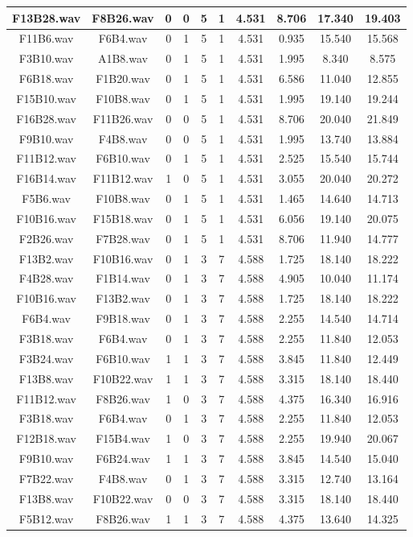 \documentclass[11pt,a4paper]{book}
\begin{document}
\begin{longtable}[c]{|c|c|c|c|c|c|c|c|c|c|}
F13B28.wav&F8B26.wav&0&0&5&1&4.531&8.706&17.340&19.403\\ \hline
F11B6.wav&F6B4.wav&0&1&5&1&4.531&0.935&15.540&15.568\\ \hline
F3B10.wav&A1B8.wav&0&1&5&1&4.531&1.995&8.340&8.575\\ \hline
F6B18.wav&F1B20.wav&0&1&5&1&4.531&6.586&11.040&12.855\\ \hline
F15B10.wav&F10B8.wav&0&1&5&1&4.531&1.995&19.140&19.244\\ \hline
F16B28.wav&F11B26.wav&0&0&5&1&4.531&8.706&20.040&21.849\\ \hline
F9B10.wav&F4B8.wav&0&0&5&1&4.531&1.995&13.740&13.884\\ \hline
F11B12.wav&F6B10.wav&0&1&5&1&4.531&2.525&15.540&15.744\\ \hline
F16B14.wav&F11B12.wav&1&0&5&1&4.531&3.055&20.040&20.272\\ \hline
F5B6.wav&F10B8.wav&0&1&5&1&4.531&1.465&14.640&14.713\\ \hline
F10B16.wav&F15B18.wav&0&1&5&1&4.531&6.056&19.140&20.075\\ \hline
F2B26.wav&F7B28.wav&0&1&5&1&4.531&8.706&11.940&14.777\\ \hline
F13B2.wav&F10B16.wav&0&1&3&7&4.588&1.725&18.140&18.222\\ \hline
F4B28.wav&F1B14.wav&0&1&3&7&4.588&4.905&10.040&11.174\\ \hline
F10B16.wav&F13B2.wav&0&1&3&7&4.588&1.725&18.140&18.222\\ \hline
F6B4.wav&F9B18.wav&0&1&3&7&4.588&2.255&14.540&14.714\\ \hline
F3B18.wav&F6B4.wav&0&1&3&7&4.588&2.255&11.840&12.053\\ \hline
F3B24.wav&F6B10.wav&1&1&3&7&4.588&3.845&11.840&12.449\\ \hline
F13B8.wav&F10B22.wav&1&1&3&7&4.588&3.315&18.140&18.440\\ \hline
F11B12.wav&F8B26.wav&1&0&3&7&4.588&4.375&16.340&16.916\\ \hline
F3B18.wav&F6B4.wav&0&1&3&7&4.588&2.255&11.840&12.053\\ \hline
F12B18.wav&F15B4.wav&1&0&3&7&4.588&2.255&19.940&20.067\\ \hline
F9B10.wav&F6B24.wav&1&1&3&7&4.588&3.845&14.540&15.040\\ \hline
F7B22.wav&F4B8.wav&0&1&3&7&4.588&3.315&12.740&13.164\\ \hline
F13B8.wav&F10B22.wav&0&0&3&7&4.588&3.315&18.140&18.440\\ \hline
F5B12.wav&F8B26.wav&1&1&3&7&4.588&4.375&13.640&14.325\\ \hline

\end{longtable}
\end{document}

